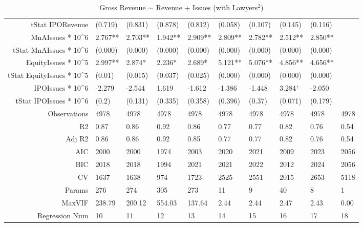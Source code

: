 \begin{table}[ht]
\begin{tabular}{rlllllllll}
  tStat IPORevenue & (0.719) & (0.831) & (0.878) & (0.812) & (0.058) & (0.107) & (0.145) & (0.116) &  \\ 
  MnAIssues * 10^6 & 2.767** & 2.703** & 1.942** & 2.909** & 2.809** & 2.782** & 2.512** & 2.850** &  \\ 
  tStat MnAIssues * 10^6 & (0.000) & (0.000) & (0.000) & (0.000) & (0.000) & (0.000) & (0.000) & (0.000) &  \\ 
  EquityIssues * 10^5 & 2.997** & 2.874* & 2.236* & 2.689* & 5.121** & 5.076** & 4.856** & 4.656** &  \\ 
  tStat EquityIssues * 10^5 & (0.01) & (0.015) & (0.037) & (0.025) & (0.000) & (0.000) & (0.000) & (0.000) &  \\ 
  IPOIssues * 10^6 & -2.279 & -2.544 & 1.619 & -1.612 & -1.386 & -1.448 & 3.284$^{+}$ & -2.050 &  \\ 
  tStat IPOIssues * 10^6 & (0.2) & (0.131) & (0.335) & (0.358) & (0.396) & (0.37) & (0.071) & (0.179) &  \\ 
  Observations & 4978 & 4978 & 4978 & 4978 & 4978 & 4978 & 4978 & 4978 & 4978 \\ 
  R2 & 0.87 & 0.86 & 0.92 & 0.86 & 0.77 & 0.77 & 0.82 & 0.76 & 0.54 \\ 
  Adj R2 & 0.86 & 0.86 & 0.92 & 0.85 & 0.77 & 0.77 & 0.82 & 0.76 & 0.54 \\ 
  AIC & 2000 & 2000 & 1974 & 2003 & 2020 & 2021 & 2009 & 2023 & 2056 \\ 
  BIC & 2018 & 2018 & 1994 & 2021 & 2021 & 2022 & 2012 & 2024 & 2056 \\ 
  CV & 1637 & 1638 & 974 & 1723 & 2525 & 2551 & 2015 & 2653 & 5118 \\ 
  Params & 276 & 274 & 305 & 273 & 11 & 9 & 40 & 8 & 1 \\ 
  MaxVIF & 238.79 & 200.12 & 554.03 & 137.64 & 2.44 & 2.44 & 2.47 & 2.43 & 0.00 \\ 
  Regression Num & 10 & 11 & 12 & 13 & 14 & 15 & 16 & 17 & 18 \\ 
   \hline
\end{tabular}
\caption{Gross Revenue $\sim$ Revenue + Issues (with Lawyers$^2$)} 
\end{table}
